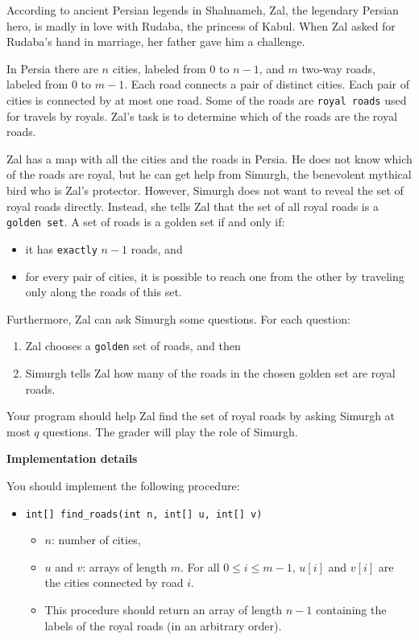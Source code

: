 According to ancient Persian legends in Shahnameh, Zal, the legendary Persian hero, is madly in love with Rudaba, the princess of Kabul. When Zal asked for Rudaba's hand in marriage, her father gave him a challenge.

In Persia there are $n$ cities, labeled from $0$ to $n - 1$, and $m$ two-way roads, labeled from $0$ to $m - 1$. Each road connects a pair of distinct cities.
Each pair of cities is connected by at most one road. Some of the roads are \texttt{royal roads} used for travels by royals. Zal's task is to determine which of the roads are the royal roads.

Zal has a map with all the cities and the roads in Persia. He does not know which of the roads are royal, but he can get help from Simurgh, the benevolent mythical bird who is Zal's protector. However, Simurgh does not want to reveal the set of royal roads directly. Instead, she tells Zal that the set of all royal roads is a \texttt{golden set}. A set of roads is a golden set if and only if:
\begin{itemize}
\item it has \texttt{exactly} $n - 1$ roads, and
\item for every pair of cities, it is possible to reach one from the other by traveling only along the roads of this set.
\end{itemize}

Furthermore, Zal can ask Simurgh some questions.
For each question:
\begin{enumerate}
\item Zal chooses a \texttt{golden} set of roads, and then
\item Simurgh tells Zal how many of the roads in the chosen golden set are royal roads.
\end{enumerate}

Your program should help Zal find the set of royal roads by asking Simurgh at most $q$ questions. The grader will play the role of Simurgh.

\textbf{Implementation details}

You should implement the following procedure:

\begin{itemize}
\item \texttt{int[] find\_roads(int n, int[] u, int[] v)}
\begin{itemize}
\item $n$: number of cities,
\item $u$ and $v$: arrays of length $m$. For all $0 \leq i \leq m - 1$, $u[i]$ and $v[i]$ are the cities connected by road $i$.
\item This procedure should return an array of length $n - 1$ containing the labels of the royal roads (in an arbitrary order).
\end{itemize}
\end{itemize}


